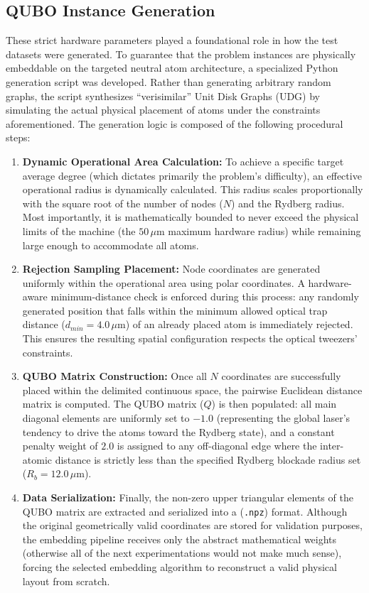 \subsection{QUBO Instance Generation}
These strict hardware parameters played a foundational role in how the test datasets were generated. To guarantee that the problem instances are physically embeddable on the targeted neutral atom architecture, a specialized Python generation script was developed. Rather than generating arbitrary random graphs, the script synthesizes ``verisimilar'' Unit Disk Graphs (UDG) by simulating the actual physical placement of atoms under the constraints aforementioned.
The generation logic is composed of the following procedural steps:
\begin{enumerate}
    \item \textbf{Dynamic Operational Area Calculation:} To achieve a specific target average degree (which dictates primarily the problem's difficulty), an effective operational radius is dynamically calculated. This radius scales proportionally with the square root of the number of nodes ($N$) and the Rydberg radius. Most importantly, it is mathematically bounded to never exceed the physical limits of the machine (the $50\,\mu\text{m}$ maximum hardware radius) while remaining large enough to accommodate all atoms.
    \item \textbf{Rejection Sampling Placement:} Node coordinates are generated uniformly within the operational area using polar coordinates. A hardware-aware minimum-distance check is enforced during this process: any randomly generated position that falls within the minimum allowed optical trap distance ($d_{min} = 4.0\,\mu\text{m}$) of an already placed atom is immediately rejected. This ensures the resulting spatial configuration respects the optical tweezers' constraints.
    \item \textbf{QUBO Matrix Construction:} Once all $N$ coordinates are successfully placed within the delimited continuous space, the pairwise Euclidean distance matrix is computed. The QUBO matrix ($Q$) is then populated: all main diagonal elements are uniformly set to $-1.0$ (representing the global laser's tendency to drive the atoms toward the Rydberg state), and a constant penalty weight of $2.0$ is assigned to any off-diagonal edge where the inter-atomic distance is strictly less than the specified Rydberg blockade radius set ($R_b = 12.0\,\mu\text{m}$).
    \item \textbf{Data Serialization:} Finally, the non-zero upper triangular elements of the QUBO matrix are extracted and serialized into a (\texttt{.npz}) format. Although the original geometrically valid coordinates are stored for validation purposes, the embedding pipeline receives only the abstract mathematical weights (otherwise all of the next experimentations would not make much sense), forcing the selected embedding algorithm to reconstruct a valid physical layout from scratch.
\end{enumerate}

